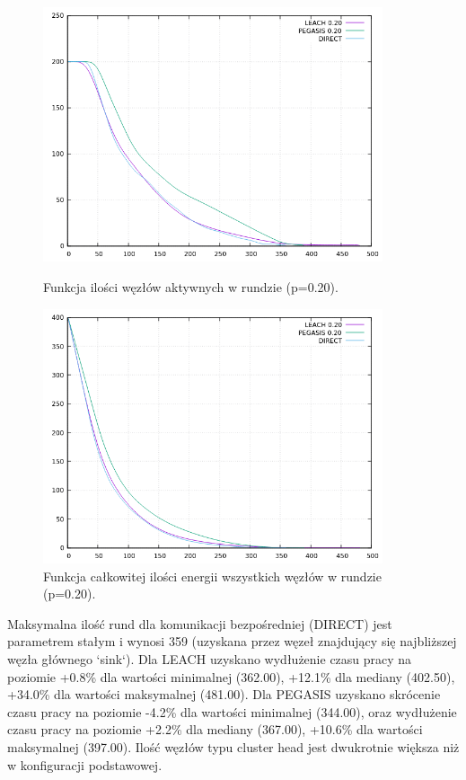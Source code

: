 \documentclass[a4paper,12pt,twoside,openany]{report}
\begin{document}
\begin{figure}[H]
 \centering
 \includegraphics[width=10cm]{images/gnuplot/test_4/nodes_in_round_p020.png}
 \caption{Funkcja ilości węzłów aktywnych w rundzie (p=0.20).}
 \includegraphics[width=10cm]{images/gnuplot/test_4/energy_in_round_p020.png}
 \caption{Funkcja całkowitej ilości energii wszystkich węzłów w rundzie (p=0.20).}
\end{figure}

\par
Maksymalna ilość rund dla komunikacji bezpośredniej (DIRECT) jest parametrem stałym i wynosi 359 (uzyskana przez węzeł znajdujący się najbliższej węzła głównego `sink`).
Dla LEACH uzyskano wydłużenie czasu pracy na poziomie +0.8\% dla wartości minimalnej (362.00), +12.1\% dla mediany (402.50), +34.0\% dla wartości maksymalnej (481.00).
Dla PEGASIS uzyskano skrócenie czasu pracy na poziomie -4.2\% dla wartości minimalnej (344.00), oraz wydłużenie czasu pracy na poziomie +2.2\% dla mediany (367.00), +10.6\% dla wartości maksymalnej (397.00).
Ilość węzłów typu cluster head jest dwukrotnie większa niż w konfiguracji podstawowej.
\end{document}
